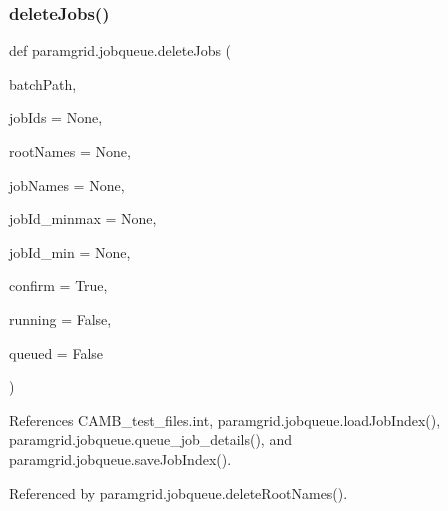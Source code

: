 \subsubsection{\texorpdfstring{delete\+Jobs()}{deleteJobs()}}
{\footnotesize\ttfamily def paramgrid.\+jobqueue.\+delete\+Jobs (\begin{DoxyParamCaption}\item[{}]{batch\+Path,  }\item[{}]{job\+Ids = {\ttfamily None},  }\item[{}]{root\+Names = {\ttfamily None},  }\item[{}]{job\+Names = {\ttfamily None},  }\item[{}]{job\+Id\+\_\+minmax = {\ttfamily None},  }\item[{}]{job\+Id\+\_\+min = {\ttfamily None},  }\item[{}]{confirm = {\ttfamily True},  }\item[{}]{running = {\ttfamily False},  }\item[{}]{queued = {\ttfamily False} }\end{DoxyParamCaption})}



References C\+A\+M\+B\+\_\+test\+\_\+files.\+int, paramgrid.\+jobqueue.\+load\+Job\+Index(), paramgrid.\+jobqueue.\+queue\+\_\+job\+\_\+details(), and paramgrid.\+jobqueue.\+save\+Job\+Index().



Referenced by paramgrid.\+jobqueue.\+delete\+Root\+Names().

